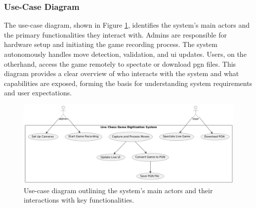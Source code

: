 \subsubsection*{Use-Case Diagram}
\label{subsubsec:use-case-diagram}

The use-case diagram, shown in Figure \ref{fig:use-case}, identifies the system’s main actors and the primary functionalities they interact with. Admins are responsible for hardware setup and initiating the game recording process. The system autonomously handles move detection, validation, and \gls{ui} updates. Users, on the otherhand, access the game remotely to spectate or download \gls{pgn} files. This diagram provides a clear overview of who interacts with the system and what capabilities are exposed, forming the basis for understanding system requirements and user expectations.

\begin{figure}[h!]
    \centering
    \includegraphics[width=\linewidth]{figures/results/uml/use-case.png}
    \caption[Use-case diagram]{Use-case diagram outlining the system’s main actors and their interactions with key functionalities.}
    \label{fig:use-case}
\end{figure}  

